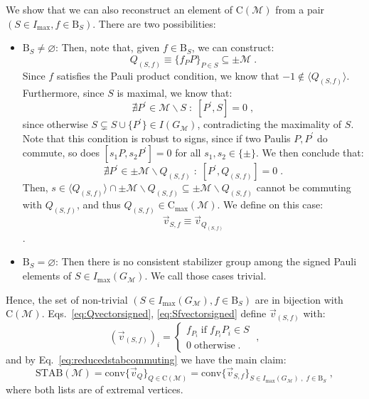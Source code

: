 \documentclass[10pt,aps,pra,twocolumn,floatfix,nofootinbib,superscriptaddress,longbibliography]{revtex4-2}
\newcommand{\1}{\mathbbm{1}}
\begin{document}
We show that we can also reconstruct an element of $\mathrm C(\mathcal M)$ from a pair $(S \in I_\mathrm{max}, f \in \mathrm B_S)$. There are two possibilities:
\begin{itemize}
    \item $\mathrm B_S \neq \varnothing$: Then, note that, given $f \in \mathrm B_S$, we can construct:
    \begin{equation}
        Q_{(S,f)} \equiv \{f_P  P\}_{P \in S} \subseteq \pm \mathcal M\;.
    \end{equation}
    Since $f$ satisfies the Pauli product condition, we know that $-1 \notin \langle Q_{(S,f)}\rangle$. Furthermore, since $S$ is maximal, we know that:
    \begin{equation}
        \nexists P^\prime \in \mathcal M \backslash S \;:\;[P^\prime, S]=0\;,
    \end{equation}
    since otherwise $S \subsetneq S\cup\{P^\prime\} \in I(G_\mathcal M)$, contradicting the maximality of $S$. Note that this condition is robust to signs, since if two Paulis $P, P^\prime$ do commute, so does $[s_1 P, s_2P^\prime] = 0$ for all $s_1, s_2 \in \{\pm\}$. We then conclude that:
    \begin{equation}
        \nexists P^\prime \in \pm \mathcal M \backslash Q_{(S,f)} \;:\;[P^\prime, Q_{(S,f)}]=0\;.
    \end{equation}
    Then, $s \in \langle Q_{(S,f)}\rangle \cap \pm \mathcal M \backslash Q_{(S,f)} \subseteq \pm \mathcal M\backslash Q_{(S,f)}$ cannot be commuting with $Q_{(S,f)}$, and thus $Q_{(S,f)}\in\mathrm{C}_\mathrm{max}(\mathcal{M})$. We define on this case:
    \begin{equation}
        \vec{v}_{S,f}\equiv \vec{v}_{Q_{(S,f)}}
        \label{eq:Sfvectorsigned}
    \end{equation}.
    \item $\mathrm B_S =\varnothing$: Then there is no consistent stabilizer group among the signed Pauli elements of $S \in I_\mathrm{max}(G_\mathcal M)$. We call those cases trivial.
\end{itemize}
Hence, the set of non-trivial $(S \in I_\mathrm{max}(G_\mathcal M), f \in \mathrm B_S)$ are in bijection with $\mathrm C(\mathcal M)$. Eqs.~\eqref{eq:Qvectorsigned}, \eqref{eq:Sfvectorsigned} define $\vec{v}_{(S,f)}$ with:
\begin{equation}
(\vec v_{(S,f)})_i =    
\begin{cases}
f_{P_i} \; \mathrm{if\;} f_{P_i}P_i \in S\\
0 \; \mathrm{otherwise}\;.
\end{cases}\;,
\end{equation} 
and by Eq.~\eqref{eq:reducedstabcommuting} we have the main claim:
\begin{equation}
    \mathrm{STAB}(\mathcal M) =\mathrm{conv}\{\vec{v}_Q\}_{Q \in \mathrm C(\mathcal M)} =\mathrm{conv}\{\vec v_{S,f}\}_{S \in I_\mathrm{max}(G_\mathcal M)\;,\;f \in \mathrm B_S}\;,
\end{equation}
where both lists are of extremal vertices.
\end{document}
